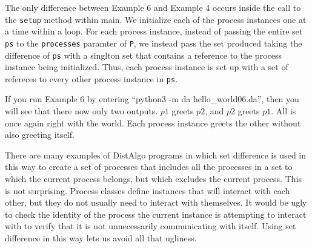 \documentclass[11pt]{article}
\begin{document}
The only difference between Example 6 and Example 4 occurs inside the call to
the \texttt{setup} method within main. We initialize each of the process
instances one at a time within a loop. For each process instance, instead of
passing the entire set \texttt{ps} to the \texttt{processes} paramter of
\texttt{P}, we instead pass the set produced taking the difference of
\texttt{ps} with a singlton set that contains a reference to the process
instance being initialized. Thus, each process instance is set up with a set of
refereces to every other process instance in \texttt{ps}.

If you run Example 6 by entering ``python3 -m da hello\_world06.da'', then you
will see that there now only two outputs. $p1$ greets $p2$, and $p2$ greets
$p1$. All is once again right with the world. Each process instance greets the
other without also greeting itself.

There are many examples of DistAlgo programs in which set difference is used in
this way to create a set of processes that includes all the processes in a set
to which the current process belongs, but which excludes the current process.
This is not surprising. Process classes define instances that will interact
with each other, but they do not usually need to interact with themselves. It
would be ugly to check the identity of the process the current instance is
attempting to interact with to verify that it is not unnecessarily
communicating with itself. Using set difference in this way lets us avoid all
that ugliness.
\end{document}
